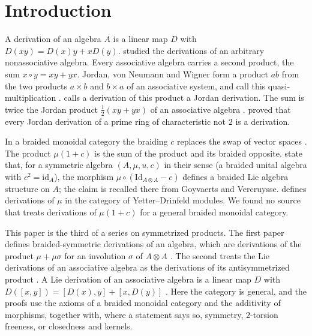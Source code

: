 \documentclass[]{interact}
\theoremstyle{plain}
\theoremstyle{definition}
\theoremstyle{remark}
\newcommand{\id}{\mathrm{id}}
\begin{document}
\section{Introduction}\label{sec:intro}

A derivation of an algebra $A$ is a linear map $D$ with $D(xy) = D(x)y + xD(y)$.
\citet[Part I]{Jacobson1937} studied the derivations of an arbitrary nonassociative algebra.
Every associative algebra carries a second product, the sum $x \circ y = xy + yx$.
Jordan, von Neumann and Wigner form a product $ab$ from the two products $a \times b$ and $b \times a$ of an associative system, and call this quasi-multiplication \citep[p.~64]{JordanVonNeumannWigner1934}.
\citet[p.~1104]{Herstein1957} calls a derivation of this product a Jordan derivation.
The sum is twice the Jordan product $\tfrac12 (xy + yx)$ of an associative algebra \citep[Example 2.1]{BresarZelmanov2025}.
\citet[Theorem 3.1]{Herstein1957} proved that every Jordan derivation of a prime ring of characteristic not $2$ is a derivation.

In a braided monoidal category the braiding $c$ replaces the swap of vector spaces \citep[Definition 2.1]{JoyalStreet1993}.
The product $\mu(1 + c)$ is the sum of the product and its braided opposite. %
\citet[Claim 2.14]{GrazianiMakhloufMeniniPanaite2015} state that, for a symmetric algebra $(A, \mu, u, c)$ in their sense (a braided unital algebra with $c^2 = \id_A$), the morphism $\mu \circ (\mathrm{Id}_{A \otimes A} - c)$ defines a braided Lie algebra structure on $A$; the claim is recalled there from Goyvaerts and Vercruysse.
\citet[Definition 5.5]{Pareigis1998} defines derivations of $\mu$ in the category of Yetter--Drinfeld modules.
We found no source that treats derivations of $\mu(1 + c)$ for a general braided monoidal category.

This paper is the third of a series on symmetrized products. %
The first paper defines braided-symmetric derivations of an algebra, which are derivations of the product $\mu + \mu\sigma$ for an involution $\sigma$ of $A \otimes A$ \citep[Definition 2.1]{Adrabi2026a}.
The second treats the Lie derivations of an associative algebra as the derivations of its antisymmetrized product \citep[Section 4]{Adrabi2026b}.
A Lie derivation of an associative algebra is a linear map $D$ with $D([x,y]) = [D(x), y] + [x, D(y)]$ \citep[p.~183]{Martindale1964}.
Here the category is general, and the proofs use the axioms of a braided monoidal category and the additivity of morphisms, together with, where a statement says so, symmetry, $2$-torsion freeness, or closedness and kernels.
\end{document}
